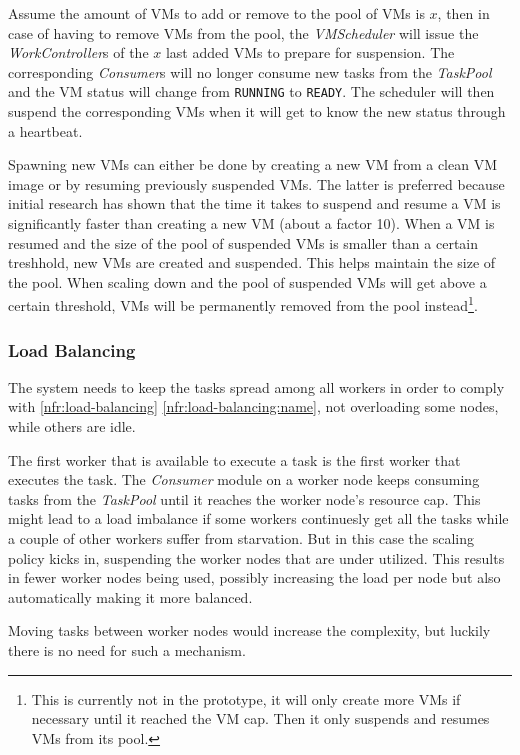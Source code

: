 \documentclass[10pt,journal,compsoc]{IEEEtran}
\def\namedref#1{\ref{#1} \ref{#1:name}}
\begin{document}
Assume the amount of VMs to add or remove to the pool of VMs is $x$, then in
case of having to remove VMs from the pool,  the
\emph{VMScheduler} will issue the \emph{WorkController}s of the $x$ last added
VMs to prepare for suspension. The corresponding \emph{Consumer}s will no longer
consume new tasks from the \emph{TaskPool} and the VM status will change from
\texttt{RUNNING} to \texttt{READY}. The scheduler will then suspend the
corresponding VMs when it will get to know the new status through a heartbeat.

Spawning new VMs can either be done by creating a new VM from a clean VM image
or by resuming previously suspended VMs. The latter is preferred because initial
research has shown that the time it takes to suspend and resume a VM is
significantly faster than creating a new VM (about a factor 10). When
a VM is resumed and the size of the pool of suspended VMs is smaller than a
certain treshhold, new VMs are created and suspended. This helps maintain the
size of the pool. When scaling down and the pool of suspended VMs will get above
a certain threshold, VMs will be permanently removed from the pool
instead\footnote{This is currently not in the prototype, it will only create
more VMs if necessary until it reached the VM cap. Then it only suspends and
resumes VMs from its pool.}.




\subsubsection{Load Balancing}
\label{sssec:load-balancing}
The system needs to keep the tasks spread among all workers in order to
comply with \namedref{nfr:load-balancing}, not overloading some nodes, while
others are idle. 

The first worker that is available to execute a task is
the first worker that executes the task. The \emph{Consumer} module on a worker
node keeps consuming tasks from the \emph{TaskPool} until it reaches the worker
node's resource cap. This might lead to a load imbalance if some workers
continuesly get all the tasks while a couple of other workers suffer from
starvation. But in this case the scaling policy kicks in, suspending the worker
nodes that are under utilized. This results in fewer worker nodes being used,
possibly increasing the load per node but also automatically making it more
balanced.

Moving tasks between worker nodes would increase the complexity, but luckily
there is no need for such a mechanism.
\end{document}
